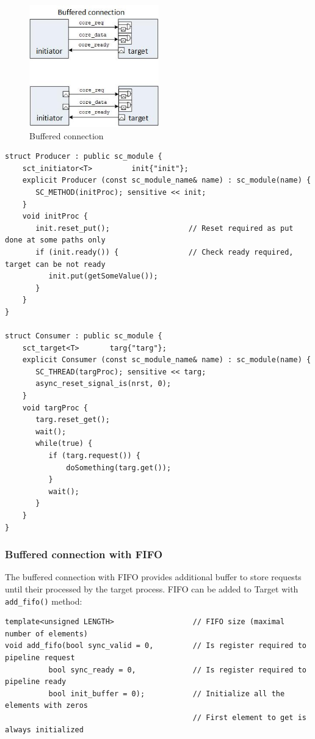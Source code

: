 \begin{figure}[!htb]
\centering
\includegraphics[width=0.5\textwidth]{pics/ss_buff_conn.jpg}
\caption{Buffered connection}
\label{fig:ss_usage}
\end{figure}

\begin{lstlisting}[style=mycpp]
struct Producer : public sc_module {
    sct_initiator<T>         init{"init"};
    explicit Producer (const sc_module_name& name) : sc_module(name) {
       SC_METHOD(initProc); sensitive << init;
    } 
    void initProc {
       init.reset_put();                  // Reset required as put done at some paths only  
       if (init.ready()) {                // Check ready required, target can be not ready 
          init.put(getSomeValue());
       }
    }
}

struct Consumer : public sc_module {
    sct_target<T>       targ{"targ"};
    explicit Consumer (const sc_module_name& name) : sc_module(name) {
       SC_THREAD(targProc); sensitive << targ;
       async_reset_signal_is(nrst, 0);
    } 
    void targProc {
       targ.reset_get();
       wait();
       while(true) {
          if (targ.request()) {      
              doSomething(targ.get()); 
          }
          wait(); 
       }
    }
}
\end{lstlisting}


\subsubsection{Buffered connection with FIFO}

The buffered connection with FIFO provides additional buffer to store requests until their processed by the target process. FIFO can be added to Target with {\tt add\_fifo()} method:

\begin{lstlisting}[style=mycpp]
template<unsigned LENGTH>                  // FIFO size (maximal number of elements)
void add_fifo(bool sync_valid = 0,         // Is register required to pipeline request
          bool sync_ready = 0,             // Is register required to pipeline ready 
          bool init_buffer = 0);           // Initialize all the elements with zeros 
                                           // First element to get is always initialized
\end{lstlisting}

